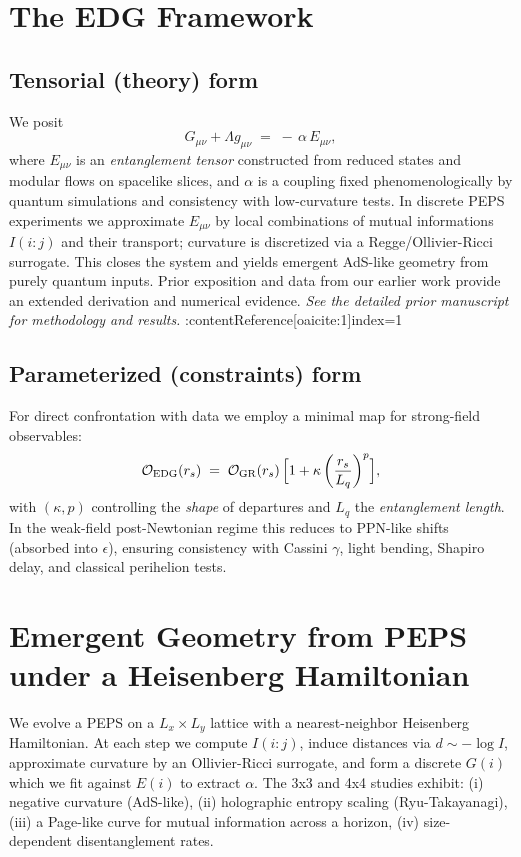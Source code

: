 \documentclass[11pt]{article}
\begin{document}
\section{The EDG Framework}
\subsection{Tensorial (theory) form}
We posit
\begin{equation}
\label{eq:edg_tensor}
G_{\mu\nu} + \Lambda g_{\mu\nu} \;=\; -\,\alpha\, E_{\mu\nu},
\end{equation}
where $E_{\mu\nu}$ is an \emph{entanglement tensor} constructed from reduced states and modular flows on spacelike slices, and $\alpha$ is a coupling fixed phenomenologically by quantum simulations and consistency with low-curvature tests.
In discrete PEPS experiments we approximate $E_{\mu\nu}$ by local combinations of mutual informations $I(i\!:\!j)$ and their transport; curvature is discretized via a Regge/Ollivier-Ricci surrogate. This closes the system and yields emergent AdS-like geometry from purely quantum inputs. Prior exposition and data from our earlier work provide an extended derivation and numerical evidence. \textit{See the detailed prior manuscript for methodology and results.} :contentReference[oaicite:1]{index=1}

\subsection{Parameterized (constraints) form}
For direct confrontation with data we employ a minimal map for strong-field observables:
\begin{equation}
\label{eq:edg_param}
\mathcal{O}_{\rm EDG}(r_s)\;=\; \mathcal{O}_{\rm GR}(r_s)\,\Big[1 + \kappa \,\bigg(\frac{r_s}{L_q}\bigg)^{p}\Big],
\end{equation}
with $(\kappa,p)$ controlling the \emph{shape} of departures and $L_q$ the \emph{entanglement length}. In the weak-field post-Newtonian regime this reduces to PPN-like shifts (absorbed into $\epsilon$), ensuring consistency with Cassini $\gamma$, light bending, Shapiro delay, and classical perihelion tests.

\section{Emergent Geometry from PEPS under a Heisenberg Hamiltonian}
We evolve a PEPS on a $L_x\times L_y$ lattice with a nearest-neighbor Heisenberg Hamiltonian. At each step we compute $I(i\!:\!j)$, induce distances via $d\sim -\log I$, approximate curvature by an Ollivier-Ricci surrogate, and form a discrete $G(i)$ which we fit against $E(i)$ to extract $\alpha$. The 3x3 and 4x4 studies exhibit:
(i) negative curvature (AdS-like),
(ii) holographic entropy scaling (Ryu-Takayanagi),
(iii) a Page-like curve for mutual information across a horizon,
(iv) size-dependent disentanglement rates.
\end{document}
